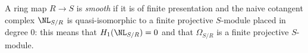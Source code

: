 \begin{definition}
\label{definition-smooth}
A ring map $R \to S$ is {\it smooth} if it is of finite presentation
and the naive cotangent complex $\NL_{S/R}$ is quasi-isomorphic to a
finite projective $S$-module placed in degree $0$: this means
that $H_1(\NL_{S/R}) = 0$ and that $\Omega_{S/R}$ is a finite projective
$S$-module.
\end{definition}